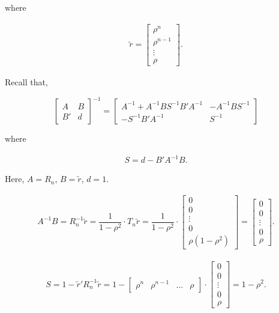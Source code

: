\documentclass[11pt, a4paper]{article}
\begin{document}
\begin{itemize}
where

\begin{align*}
\utilde{r} =
\begin{bmatrix}
\rho^n \\
\rho^{n-1} \\
\vdots \\
\rho
\end{bmatrix}.
\end{align*}

Recall that,

\begin{equation}\label{block_matrix_inverse_formula}
\begin{bmatrix}
A & B \\
B' & d
\end{bmatrix}^{-1}
=
\begin{bmatrix}
A^{-1} + A^{-1} B S^{-1} B' A^{-1} & -A^{-1} B S^{-1} \\
- S^{-1} B' A^{-1} & S^{-1}
\end{bmatrix}
\end{equation}

where

\begin{align*}
S = d - B' A^{-1} B.
\end{align*}

Here, $A = R_n$, $B = \utilde{r}$, $d = 1$.

\begin{align*}
A^{-1}B = R_n^{-1} \utilde{r} = \dfrac{1}{1 - \rho^2} \cdot T_n \utilde{r} = \dfrac{1}{1 - \rho^2} \cdot \begin{bmatrix}
0 \\
0 \\
\vdots \\
0 \\
\rho(1 - \rho^2)
\end{bmatrix}
= \begin{bmatrix}
0 \\
0 \\
\vdots \\
0 \\
\rho
\end{bmatrix}.
\end{align*}

\begin{align*}
S = 1 - \utilde{r}'R_n^{-1} \utilde{r} = 1 - \begin{bmatrix}
\rho^n & \rho^{n-1} & \ldots & \rho \end{bmatrix} \cdot \begin{bmatrix}
0 \\
0 \\
\vdots \\
0 \\
\rho
\end{bmatrix} = 1 - \rho^2.
\end{align*}



\end{itemize}
\end{document}
